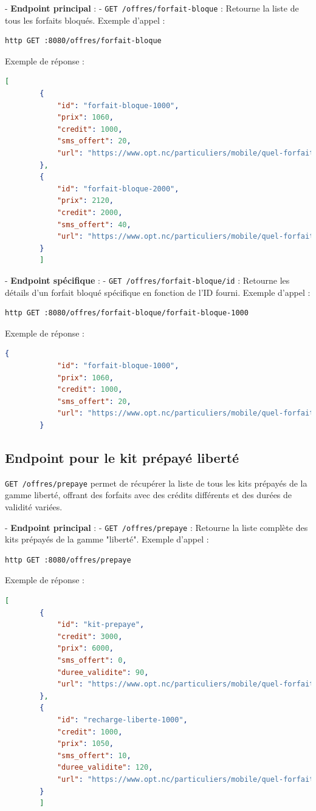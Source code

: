 \documentclass{article}
\begin{document}
	- \textbf{Endpoint principal} :
	- \texttt{GET /offres/forfait-bloque} : Retourne la liste de tous les forfaits bloqués.
	Exemple d'appel :
	\begin{lstlisting}[language=bash]
		http GET :8080/offres/forfait-bloque
	\end{lstlisting}
	Exemple de réponse :
	\begin{lstlisting}[language=JSON]
		[
		{
			"id": "forfait-bloque-1000",
			"prix": 1060,
			"credit": 1000,
			"sms_offert": 20,
			"url": "https://www.opt.nc/particuliers/mobile/quel-forfait-choisir/forfait-bloque-1000"
		},
		{
			"id": "forfait-bloque-2000",
			"prix": 2120,
			"credit": 2000,
			"sms_offert": 40,
			"url": "https://www.opt.nc/particuliers/mobile/quel-forfait-choisir/forfait-bloque-2000"
		}
		]
	\end{lstlisting}
	
	- \textbf{Endpoint spécifique} :
	- \texttt{GET /offres/forfait-bloque/{id}} : Retourne les détails d'un forfait bloqué spécifique en fonction de l'ID fourni.
	Exemple d'appel :
	\begin{lstlisting}[language=bash]
		http GET :8080/offres/forfait-bloque/forfait-bloque-1000
	\end{lstlisting}
	Exemple de réponse :
	\begin{lstlisting}[language=JSON]
		{
			"id": "forfait-bloque-1000",
			"prix": 1060,
			"credit": 1000,
			"sms_offert": 20,
			"url": "https://www.opt.nc/particuliers/mobile/quel-forfait-choisir/forfait-bloque-1000"
		}
	\end{lstlisting}
	
	\subsection{Endpoint pour le kit prépayé liberté}
	\texttt{GET /offres/prepaye} permet de récupérer la liste de tous les kits prépayés de la gamme liberté, offrant des forfaits avec des crédits différents et des durées de validité variées.
	
	- \textbf{Endpoint principal} :
	- \texttt{GET /offres/prepaye} : Retourne la liste complète des kits prépayés de la gamme "liberté".
	Exemple d'appel :
	\begin{lstlisting}[language=bash]
		http GET :8080/offres/prepaye
	\end{lstlisting}
	Exemple de réponse :
	\begin{lstlisting}[language=JSON]
		[
		{
			"id": "kit-prepaye",
			"credit": 3000,
			"prix": 6000,
			"sms_offert": 0,
			"duree_validite": 90,
			"url": "https://www.opt.nc/particuliers/mobile/quel-forfait-choisir/kit-prepaye-liberte"
		},
		{
			"id": "recharge-liberte-1000",
			"credit": 1000,
			"prix": 1050,
			"sms_offert": 10,
			"duree_validite": 120,
			"url": "https://www.opt.nc/particuliers/mobile/quel-forfait-choisir/kit-prepaye-liberte"
		}
		]
	\end{lstlisting}
	
\end{document}
